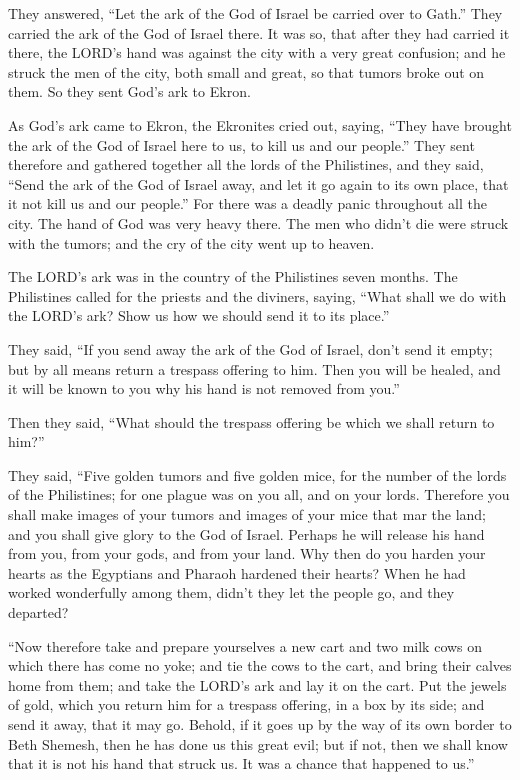 They answered, “Let the ark of the God of Israel be carried over to Gath.” They carried the
ark of the God of Israel there.
\myverse{}It was so, that after they had carried it there, the LORD’s hand was against
the city with a very great confusion; and he struck the men of the city, both small and great, so that
tumors broke out on them.
\myverse{}So they sent God’s ark to Ekron.

As God’s ark came to Ekron, the Ekronites cried out, saying, “They have brought the ark of
the God of Israel here to us, to kill us and our people.”
\myverse{}They sent therefore and gathered together all the lords of the Philistines,
and they said, “Send the ark of the God of Israel away, and let it go again to its own place, that it
not kill us and our people.” For there was a deadly panic throughout all the city. The hand of God was
very heavy there.
\myverse{}The men who didn’t die were struck with the tumors; and the cry of the city
went up to heaven.


\mychapter{} \myverse*{}The LORD’s ark was in the country of the Philistines seven months.
\myverse{}The Philistines called for the priests and the diviners, saying, “What shall
we do with the LORD’s ark? Show us how we should send it to its place.”

\myverse{}They said, “If you send away the ark of the God of Israel, don’t
send it empty; but by all means return a trespass offering to him. Then you will be healed, and it will
be known to you why his hand is not removed from you.”

\myverse{}Then they said, “What should the trespass offering be which we
shall return to him?”

They said, “Five golden tumors and five golden mice, for the number of the lords of the Philistines;
for one plague was on you all, and on your lords.
\myverse{}Therefore you shall make images of your tumors and images of your mice that
mar the land; and you shall give glory to the God of Israel. Perhaps he will release his hand from you,
from your gods, and from your land.
\myverse{}Why then do you harden your hearts as the Egyptians and Pharaoh hardened their
hearts? When he had worked wonderfully among them, didn’t they let the people go, and they departed?

\myverse{}“Now therefore take and prepare yourselves a new cart and two milk
cows on which there has come no yoke; and tie the cows to the cart, and bring their calves home from them;
\myverse{}and take the LORD’s ark and lay it on the cart. Put the jewels of gold, which
you return him for a trespass offering, in a box by its side; and send it away, that it may go.
\myverse{}Behold, if it goes up by the way of its own border to Beth Shemesh, then he
has done us this great evil; but if not, then we shall know that it is not his hand that struck us. It
was a chance that happened to us.”

